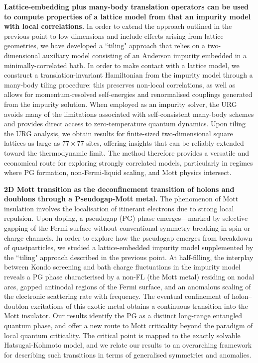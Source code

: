 \vspace{1em}
{\bf Lattice-embedding plus many-body translation operators can be used to compute properties of a lattice model from that an impurity model with local correlations.} In order to extend the approach outlined in the previous point to low dimensions and include effects arising from lattice geometries, we have developed a ``tiling" approach that relies on a two-dimensional auxiliary model consisting of an Anderson impurity embedded in a minimally-correlated bath. In order to make contact with a lattice model, we construct a translation-invariant Hamiltonian from the impurity model through a many-body tiling procedure: this preserves non-local correlations, as well as allows for momentum-resolved self-energies and renormalised couplings generated from the impurity solution.  When employed as an impurity solver, the URG avoids many of the limitations associated with self-consistent many-body schemes and provides direct access to zero-temperature quantum dynamics. Upon tiling the URG analysis, we obtain results for finite-sized two-dimensional square lattices as large as \(77 \times 77\) sites, offering insights that can be reliably extended toward the thermodynamic limit. The method therefore provides a versatile and economical route for exploring strongly correlated models, particularly in regimes where PG formation, non-Fermi-liquid scaling, and Mott physics intersect.

\vspace{1em}
{\bf 2D Mott transition as the deconfinement transition of holons and doublons through a Pseudogap-Mott metal.} The phenomenon of Mott insulation involves the localisation of itinerant electrons due to strong local repulsion. Upon doping, a pseudogap (PG) phase emerges—marked by selective gapping of the Fermi surface without conventional symmetry breaking in spin or charge channels. In order to explore how the pseudogap emerges from breakdown of quasiparticles, we studied a lattice-embedded impurity model supplemented by the ``tiling" approach described in the previous point. At half-filling, the interplay between Kondo screening and bath charge fluctuations in the impurity model reveals a PG phase characterised by a non-FL (the Mott metal) residing on nodal arcs, gapped antinodal regions of the Fermi surface, and an anomalous scaling of the electronic scattering rate with frequency. The eventual confinement of holon–doublon excitations of this exotic metal obtains a continuous transition into the Mott insulator. Our results identify the PG as a distinct long-range entangled quantum phase, and offer a new route to Mott criticality beyond the paradigm of local quantum criticality. The critical point is mapped to the exactly solvable Hatsugai-Kohmoto model, and we relate our results to an overarching framework for describing such transitions in terms of generalised symmetries and anomalies.

